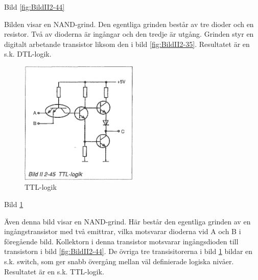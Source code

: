Bild \ref{fig:BildII2-44}

Bilden visar en NAND-grind. Den egentliga grinden består av tre dioder och en
resistor. Två av dioderna är ingångar och den tredje är utgång. Grinden styr en
digitalt arbetande transistor liksom den i bild \ref{fig:BildII2-35}.
Resultatet är en s.k. DTL-logik.

\begin{figure}
\includegraphics[width=0.5\textwidth]{images/bild_2_2-45}
\caption{TTL-logik}
\label{fig:BildII2-45}
\end{figure}

Bild \ref{fig:BildII2-45}

Även denna bild visar en NAND-grind. Här består den egentliga grinden av en
ingångstransistor med två emittrar, vilka motsvarar dioderna vid A och B i
föregående bild. Kollektorn i denna transistor motsvarar ingångsdioden till
transistorn i bild \ref{fig:BildII2-44}. De övriga tre transisitorerna i bild
\ref{fig:BildII2-45} bildar en s.k. switch, som ger snabb övergång mellan väl
definierade logiska nivåer. Resultatet är en s.k. TTL-logik.
